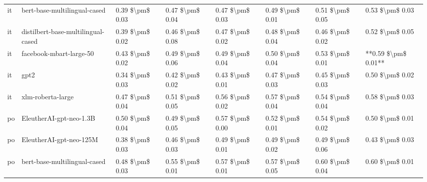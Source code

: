 \begin{tabular}{llllllll}
      it &       bert-base-multilingual-cased & 0.39 \$\textbackslash pm\$ 0.03 &           0.47 \$\textbackslash pm\$ 0.04 &       0.47 \$\textbackslash pm\$ 0.03 &        0.49 \$\textbackslash pm\$ 0.01 &                         0.51 \$\textbackslash pm\$ 0.05 &     0.53 \$\textbackslash pm\$ 0.03 \\
      it & distilbert-base-multilingual-cased & 0.39 \$\textbackslash pm\$ 0.02 &           0.46 \$\textbackslash pm\$ 0.08 &       0.47 \$\textbackslash pm\$ 0.02 &        0.48 \$\textbackslash pm\$ 0.04 &                         0.46 \$\textbackslash pm\$ 0.02 &     0.52 \$\textbackslash pm\$ 0.05 \\
      it &            facebook-mbart-large-50 & 0.43 \$\textbackslash pm\$ 0.02 &           0.49 \$\textbackslash pm\$ 0.06 &       0.49 \$\textbackslash pm\$ 0.04 &        0.50 \$\textbackslash pm\$ 0.04 &                         0.53 \$\textbackslash pm\$ 0.01 & **0.59 \$\textbackslash pm\$ 0.01** \\
      it &                               gpt2 & 0.34 \$\textbackslash pm\$ 0.03 &           0.42 \$\textbackslash pm\$ 0.02 &       0.43 \$\textbackslash pm\$ 0.01 &        0.47 \$\textbackslash pm\$ 0.03 &                         0.45 \$\textbackslash pm\$ 0.03 &     0.50 \$\textbackslash pm\$ 0.02 \\
      it &                  xlm-roberta-large & 0.47 \$\textbackslash pm\$ 0.04 &           0.51 \$\textbackslash pm\$ 0.05 &       0.56 \$\textbackslash pm\$ 0.02 &        0.57 \$\textbackslash pm\$ 0.04 &                         0.54 \$\textbackslash pm\$ 0.04 &     0.58 \$\textbackslash pm\$ 0.03 \\
      po &            EleutherAI-gpt-neo-1.3B & 0.50 \$\textbackslash pm\$ 0.04 &           0.49 \$\textbackslash pm\$ 0.05 &       0.57 \$\textbackslash pm\$ 0.00 &        0.52 \$\textbackslash pm\$ 0.01 &                         0.54 \$\textbackslash pm\$ 0.02 &     0.50 \$\textbackslash pm\$ 0.01 \\
      po &            EleutherAI-gpt-neo-125M & 0.38 \$\textbackslash pm\$ 0.03 &           0.46 \$\textbackslash pm\$ 0.03 &       0.49 \$\textbackslash pm\$ 0.01 &        0.49 \$\textbackslash pm\$ 0.02 &                         0.49 \$\textbackslash pm\$ 0.06 &     0.43 \$\textbackslash pm\$ 0.03 \\
      po &       bert-base-multilingual-cased & 0.48 \$\textbackslash pm\$ 0.03 &           0.55 \$\textbackslash pm\$ 0.01 &       0.57 \$\textbackslash pm\$ 0.01 &        0.57 \$\textbackslash pm\$ 0.05 &                         0.60 \$\textbackslash pm\$ 0.04 &     0.60 \$\textbackslash pm\$ 0.01 \\

\end{tabular}
